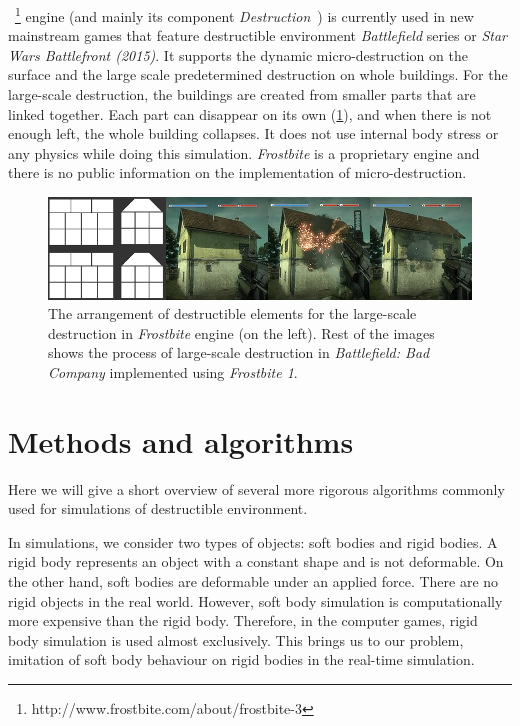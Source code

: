 ~\footnote{http://www.frostbite.com/about/frostbite-3} engine (and mainly its component \emph{Destruction}~\cite{destruction}) is currently used in new mainstream games that feature destructible environment \eg \emph{Battlefield} series or \emph{Star Wars Battlefront (2015)}. It supports the dynamic micro-destruction on the surface and the large scale predetermined destruction on whole buildings.  For the large-scale destruction, the buildings are created from smaller parts that are linked together. Each part can disappear on its own (\cref{fig:frostbite}), and when there is not enough left, the whole building collapses. It does not use internal body stress or any physics while doing this simulation. \emph{Frostbite} is a proprietary engine and there is no public information on the implementation of micro-destruction. 

\begin{figure}
\centering
\includegraphics[width=\textwidth]{img/frostbite}
\caption{The arrangement of destructible elements for the large-scale destruction in \emph{Frostbite} engine (on the left). Rest of the images shows the process of large-scale destruction in \emph{Battlefield: Bad Company} implemented using \emph{Frostbite 1}.}
\label{fig:frostbite}
\end{figure}

\section{Methods and algorithms}

Here we will give a short overview of several more rigorous algorithms commonly used for simulations of destructible environment. 

In simulations, we consider two types of objects: soft bodies and rigid bodies. A rigid body represents an object with a constant shape and is not deformable. On the other hand, soft bodies are deformable under an applied force. There are no rigid objects in the real world. However, soft body simulation is computationally more expensive than the rigid body. Therefore, in the computer games, rigid body simulation is used almost exclusively. This brings us to our problem, imitation of soft body behaviour on rigid bodies in the real-time simulation. 

